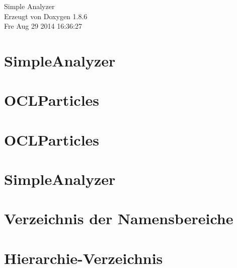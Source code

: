 \documentclass[twoside]{book}
\newcommand{\clearemptydoublepage}{%
  \newpage{\pagestyle{empty}\cleardoublepage}%
}
\begin{document}
\hypersetup{pageanchor=false}
\begin{titlepage}
\vspace*{7cm}
\begin{center}%
{\Large Simple Analyzer }\\
\vspace*{1cm}
{\large Erzeugt von Doxygen 1.8.6}\\
\vspace*{0.5cm}
{\small Fre Aug 29 2014 16:36:27}\\
\end{center}
\end{titlepage}
\clearemptydoublepage
\tableofcontents
\clearemptydoublepage
{}
\hypersetup{pageanchor=true}

\chapter{Simple\-Analyzer}
\label{index}\hypertarget{index}{}
\chapter{O\-C\-L\-Particles}
\label{md__daten_Projekte_eclipse_workspace_CLGL_test_README}
\hypertarget{md__daten_Projekte_eclipse_workspace_CLGL_test_README}{}

\chapter{O\-C\-L\-Particles}
\label{md__daten_Projekte_eclipse_workspace_particle_sim_README}
\hypertarget{md__daten_Projekte_eclipse_workspace_particle_sim_README}{}

\chapter{Simple\-Analyzer}
\label{md__daten_Projekte_eclipse_workspace_README}
\hypertarget{md__daten_Projekte_eclipse_workspace_README}{}

\chapter{Verzeichnis der Namensbereiche}

\chapter{Hierarchie-\/\-Verzeichnis}

\end{document}
